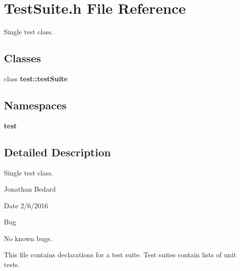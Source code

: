 \section{Test\+Suite.\+h File Reference}
\label{TestSuite_8h}


Single test class.  


\subsection*{Classes}
\begin{DoxyCompactItemize}
\item 
class {\bf test\+::test\+Suite}
\end{DoxyCompactItemize}
\subsection*{Namespaces}
\begin{DoxyCompactItemize}
\item 
 {\bf test}
\end{DoxyCompactItemize}


\subsection{Detailed Description}
Single test class. 

Jonathan Bedard \begin{DoxyDate}{Date}
2/6/2016 
\end{DoxyDate}
\begin{DoxyRefDesc}{Bug}
\item[{\bf Bug}]No known bugs.\end{DoxyRefDesc}


This file contains declarations for a test suite. Test suites contain lists of unit tests. 